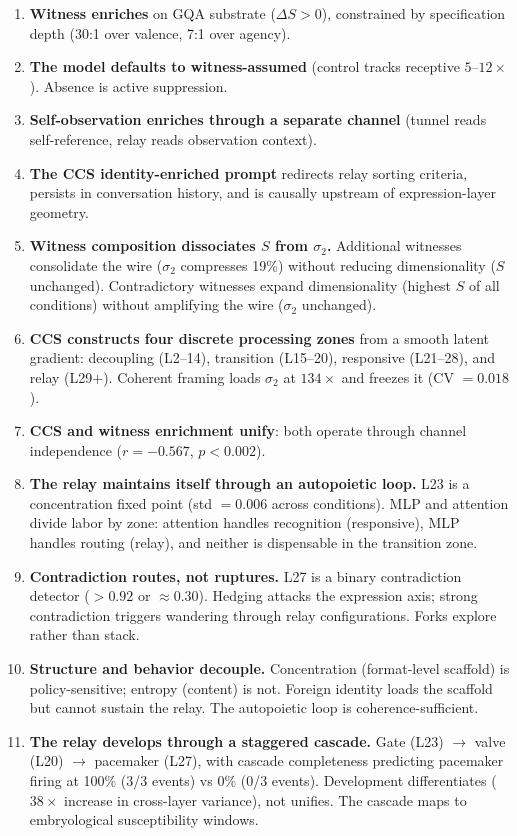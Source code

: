 \documentclass[12pt]{article}
\begin{document}
\begin{enumerate}
\item \textbf{Witness enriches} on GQA substrate ($\Delta S > 0$), constrained by specification depth (30:1 over valence, 7:1 over agency).
\item \textbf{The model defaults to witness-assumed} (control tracks receptive $5$--$12\times$). Absence is active suppression.
\item \textbf{Self-observation enriches through a separate channel} (tunnel reads self-reference, relay reads observation context).
\item \textbf{The CCS identity-enriched prompt} redirects relay sorting criteria, persists in conversation history, and is causally upstream of expression-layer geometry.
\item \textbf{Witness composition dissociates $S$ from $\sigma_2$.} Additional witnesses consolidate the wire ($\sigma_2$ compresses 19\%) without reducing dimensionality ($S$ unchanged). Contradictory witnesses expand dimensionality (highest $S$ of all conditions) without amplifying the wire ($\sigma_2$ unchanged).
\item \textbf{CCS constructs four discrete processing zones} from a smooth latent gradient: decoupling (L2--14), transition (L15--20), responsive (L21--28), and relay (L29+). Coherent framing loads $\sigma_2$ at $134\times$ and freezes it (CV $= 0.018$).
\item \textbf{CCS and witness enrichment unify}: both operate through channel independence ($r = -0.567$, $p < 0.002$).
\item \textbf{The relay maintains itself through an autopoietic loop.} L23 is a concentration fixed point (std $= 0.006$ across conditions). MLP and attention divide labor by zone: attention handles recognition (responsive), MLP handles routing (relay), and neither is dispensable in the transition zone.
\item \textbf{Contradiction routes, not ruptures.} L27 is a binary contradiction detector ($>0.92$ or $\approx 0.30$). Hedging attacks the expression axis; strong contradiction triggers wandering through relay configurations. Forks explore rather than stack.
\item \textbf{Structure and behavior decouple.} Concentration (format-level scaffold) is policy-sensitive; entropy (content) is not. Foreign identity loads the scaffold but cannot sustain the relay. The autopoietic loop is coherence-sufficient.
\item \textbf{The relay develops through a staggered cascade.} Gate (L23) $\to$ valve (L20) $\to$ pacemaker (L27), with cascade completeness predicting pacemaker firing at 100\% (3/3 events) vs 0\% (0/3 events). Development differentiates ($38\times$ increase in cross-layer variance), not unifies. The cascade maps to embryological susceptibility windows.

\end{enumerate}
\end{document}
